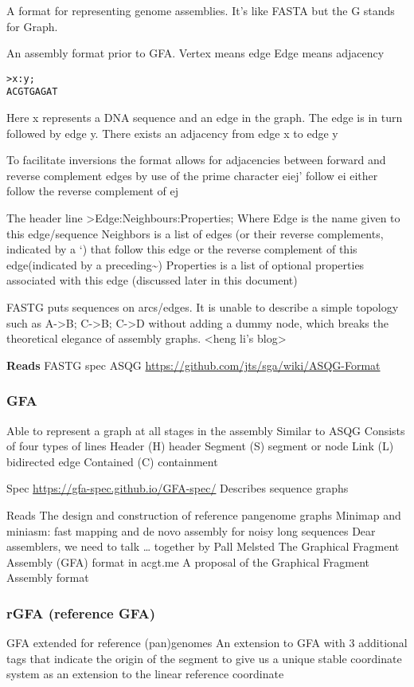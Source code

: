\documentclass[11pt]{article}
\begin{document}
A format for representing genome assemblies. It’s like FASTA but the G stands for Graph.

An assembly format prior to GFA.
Vertex means edge
Edge means adjacency


\begin{lstlisting}
>x:y;
ACGTGAGAT
\end{lstlisting}



Here x represents a DNA sequence and an edge in the graph.
The edge is in turn followed by edge y. There exists an adjacency from edge x to edge y

To facilitate inversions the format allows for adjacencies between forward and reverse complement edges by use of the prime character
eiej’     follow ei either follow the reverse complement of ej

The header line
>Edge:Neighbours:Properties;
Where 
Edge is the name given to this edge/sequence
Neighbors is a list of edges (or their reverse complements, indicated by a ‘) that follow this edge or the reverse complement of this edge(indicated by a preceding\textasciitilde{})
Properties is a list of optional properties associated with this edge (discussed later in this document)

FASTG puts sequences on arcs/edges. It is unable to describe a simple topology such as A->B; C->B; C->D without adding a dummy node, which breaks the theoretical elegance of assembly graphs. <heng li’s blog>

\textbf{Reads}
FASTG spec 
ASQG
\url{https://github.com/jts/sga/wiki/ASQG-Format}

\subsubsection{GFA}
\label{sec:orge9b5625}
Able to represent a graph at all stages in the assembly
Similar to ASQG
Consists of four types of lines
Header (H) header
Segment (S) segment or node
Link (L) bidirected edge
Contained (C) containment

Spec \url{https://gfa-spec.github.io/GFA-spec/}
Describes sequence graphs

Reads
The design and construction of reference pangenome graphs
Minimap and miniasm: fast mapping and de novo assembly for noisy long sequences
Dear assemblers, we need to talk … together by Pall Melsted
The Graphical Fragment Assembly (GFA) format in acgt.me
A proposal of the Graphical Fragment Assembly format


\subsubsection{rGFA  (reference GFA)}
\label{sec:orge4cffc3}
GFA extended for reference (pan)genomes
An extension to GFA with 3 additional tags that indicate the origin of the segment to give us a unique stable coordinate system as an extension to the linear reference coordinate
\end{document}
